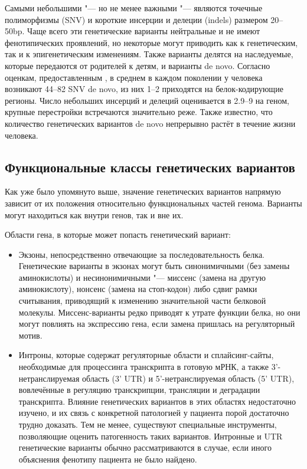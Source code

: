 \documentclass[a4paper,12pt]{article}
\begin{document}
Самыми небольшими "--- но не менее важными "--- являются точечные полиморфизмы (SNV) и короткие инсерции и делеции (indels) размером 20--50bp.
Чаще всего эти генетические варианты нейтральные и не имеют фенотипических проявлений, но некоторые могут приводить как к генетическим, так и к эпигенетическим изменениям.
Также варианты делятся на наследуемые, которые передаются от родителей к детям, и варианты de novo.
Согласно оценкам, предоставленным \cite{acuna-higaldo}, в среднем в каждом поколении у человека возникают 44--82 SNV de novo, из них 1--2 приходятся на белок-кодирующие регионы.
Число небольших инсерций и делеций оценивается в 2.9--9 на геном, крупные перестройки встречаются значительно реже.
Также известно, что количество генетических вариантов de novo непрерывно растёт в течение жизни человека.

\subsection{Функциональные классы генетических вариантов}

Как уже было упомянуто выше, значение генетических вариантов напрямую зависит от их положения относительно функциональных частей генома.
Варианты могут находиться как внутри генов, так и вне их.

Области гена, в которые может попасть генетический вариант:

\begin{itemize}
\item Экзоны, непосредственно отвечающие за последовательность белка.
Генетические варианты в экзонах могут быть синонимичными (без замены аминокислоты) и несинонимичными "--- миссенс (замена на другую аминокислоту), нонсенс (замена на стоп-кодон) либо сдвиг рамки считывания, приводящий к изменению значительной части белковой молекулы.
Миссенс-варианты редко приводят к утрате функции белка, но они могут повлиять на экспрессию гена, если замена пришлась на регуляторный мотив\cite{brea-fernandez}.
\item Интроны, которые содержат регуляторные области и сплайсинг-сайты, необходимые для процессинга транскрипта в готовую мРНК, а также 3'-нетранслируемая область (3' UTR) и 5'-нетранслируемая область (5' UTR), вовлечённые в регуляцию транскрипции, трансляции и деградации транскрипта.
Влияние генетических вариантов в этих областях недостаточно изучено, и их связь с конкретной патологией у пациента порой достаточно трудно доказать.
Тем не менее, существуют специальные инструменты, позволяющие оценить патогенность таких вариантов.
Интронные и UTR генетические варианты обычно рассматриваются в случае, если иного объяснения фенотипу пациента не было найдено.
\end{itemize}
\end{document}
